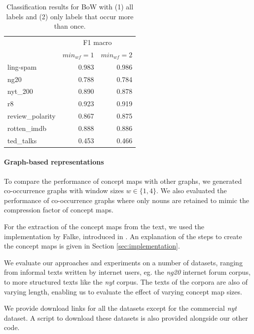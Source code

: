 \begin{table}
\centering
\begin{tabular}{lrr}
	{} & \multicolumn{2}{c}{F1 macro} \\
	{} &                         $min_{wf} = 1$ &  $min_{wf} = 2$  \\
	\midrule
	ling-spam       & 0.983 & 0.986 \\
	ng20            & 0.788 & 0.784 \\
	nyt\_200         & 0.890 & 0.878 \\
	r8              & 0.923 & 0.919 \\
	review\_polarity & 0.867 & 0.875 \\
	rotten\_imdb     & 0.888 & 0.886 \\
	ted\_talks       & 0.453 & 0.466 \\
	\bottomrule
\end{tabular}
\caption[Results: BoW minimum word frequency]{Classification results for BoW with (1) all labels and (2) only labels that occur more than once.}
\label{table:results_min_df}
\end{table}

\paragraph{Graph-based representations}
To compare the performance of concept maps with other graphs, we generated co-occurrence graphs with window sizes $w \in \{1, 4\}$.
We also evaluated the performance of co-occurrence graphs where only nouns are retained to mimic the compression factor of concept maps.

For the extraction of the concept maps from the text, we used the implementation by Falke, introduced in \cite{Falke2017}.
An explanation of the steps to create the concept maps is given in Section \ref{sec:implementation}.

We evaluate our approaches and experiments on a number of datasets, ranging from informal texts written by internet users, eg.  the \textit{ng20} internet forum corpus, to more structured texts like the \textit{nyt} corpus.
The texts of the corpora are also of varying length, enabling us to evaluate the effect of varying concept map sizes.

We provide download links for all the datasets except for the commercial \textit{nyt} dataset.
A script to download these datasets is also provided alongside our other code.

